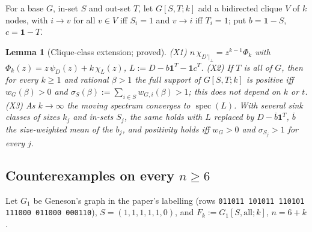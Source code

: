 \documentclass[11pt]{article}
\newtheorem{lemma}[theorem]{Lemma}
\theoremstyle{definition}
\newcommand{\one}{\mathbf{1}}
\newcommand{\perpc}[1]{#1|_{\perp}}
\newcommand{\spec}{\operatorname{spec}}
\begin{document}
For a base $G$, in-set $S$ and out-set $T$, let $G[S,T;k]$ add a bidirected clique $V$ of $k$ nodes, with $i\to v$ for all $v\in V$
iff $S_i=1$ and $v\to i$ iff $T_i=1$; put $b=\one-S$, $c=\one-T$.

\begin{lemma}[Clique-class extension; proved]\label{lem:X}
(X1) $n\,\chi_{\perpc{D'}}=z^{k-1}\Phi_k$ with $\Phi_k(z)=z\,\psi_D(z)+k\,\chi_L(z)$, $L:=D-b\one^T-\one c^T$.
(X2) If $T$ is all of $G$, then for every $k\ge1$ and rational $\beta>1$ the full support of $G[S,T;k]$ is positive iff
$w_G(\beta)>0$ and $\sigma_S(\beta):=\sum_{i\in S}w_{G,i}(\beta)>1$; this does not depend on $k$ or $t$.
(X3) As $k\to\infty$ the moving spectrum converges to $\spec(L)$. With several sink classes of sizes $k_j$ and in-sets $S_j$,
the same holds with $L$ replaced by $D-\bar b\one^T$, $\bar b$ the size-weighted mean of the $b_j$, and positivity holds iff
$w_G>0$ and $\sigma_{S_j}>1$ for every $j$.
\end{lemma}

\subsection{Counterexamples on every \texorpdfstring{$n\ge6$}{n >= 6}}
Let $G_1$ be Geneson's graph in the paper's labelling (rows \texttt{011011 101011 110101 111000 011000 000110}), $S=(1,1,1,1,1,0)$,
and $F_k:=G_1[S,\text{all};k]$, $n=6+k$.
\end{document}
